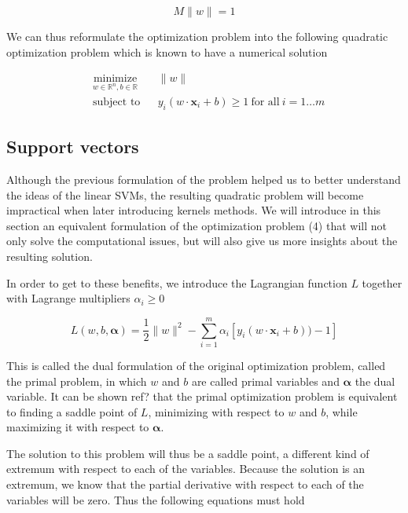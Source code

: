\begin{equation*}
  M\|w\| = 1
\end{equation*}
  
We can thus reformulate the optimization problem into the following quadratic optimization problem which is known to have a numerical solution

\begin{equation}
  \begin{aligned}
    &\underset{w \in \mathbb{R}^n, b \in \mathbb{R}} {\text{minimize}}
    & &\|w\|\\
    &\text{subject to}
    & &y_i(w \cdot \mathbf{x}_i + b) \ge 1\ \text{for all}\ i = 1 \dotsc m
  \end{aligned}
\end{equation}

\subsection {Support vectors}

Although the previous formulation of the problem helped us to better understand the ideas of the linear SVMs, the resulting quadratic problem will become impractical when later introducing kernels methods. We will introduce in this section an equivalent formulation of the optimization problem (4) that will not only solve the computational issues, but will also give us more insights about the resulting solution.

In order to get to these benefits, we introduce the Lagrangian function $L$ together with Lagrange multipliers $\alpha_i \ge 0$

\begin{equation}
  L(w, b, \boldsymbol{\alpha}) = \frac{1}{2}\|w\|^2 - \sum^m_{i=1} \alpha_i[y_i(w \cdot \mathbf{x}_i + b)) - 1]
\end{equation}

This is called the dual formulation of the original optimization problem, called the primal problem, in which $w$ and $b$ are called primal variables and $\boldsymbol{\alpha}$ the dual variable. It can be shown \textcolor[rgb]{1,0,0}{ref?} that the primal optimization problem is equivalent to finding a saddle point of $L$, minimizing with respect to $w$ and $b$, while maximizing it with respect to $\boldsymbol{\alpha}$.

The solution to this problem will thus be a saddle point, a different kind of extremum with respect to each of the variables. Because the solution is an extremum, we know that the partial derivative with respect to each of the variables will be zero. Thus the following equations must hold

